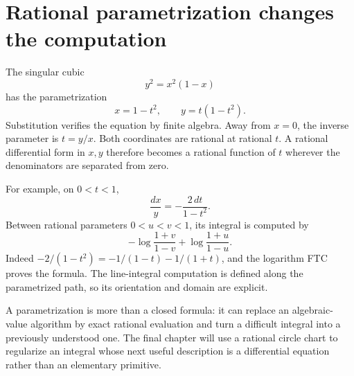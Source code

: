 \section{Rational parametrization changes the computation}
The singular cubic
\[
 y^2=x^2(1-x)
\]
has the parametrization
\[
 x=1-t^2,\qquad y=t(1-t^2).
\]
Substitution verifies the equation by finite algebra.  Away from $x=0$,
the inverse parameter is $t=y/x$.  Both coordinates are rational at
rational $t$.  A rational differential form in $x,y$ therefore becomes a
rational function of $t$ wherever the denominators are separated from
zero.

For example, on $0<t<1$,
\[
 \frac{dx}{y}=-\frac{2\,dt}{1-t^2}.
\]
Between rational parameters $0<u<v<1$, its integral is computed by
\[
 -\log\frac{1+v}{1-v}+\log\frac{1+u}{1-u}.
\]
Indeed $-2/(1-t^2)=-1/(1-t)-1/(1+t)$, and the logarithm FTC proves the
formula.  The line-integral computation is defined along the parametrized
path, so its orientation and domain are explicit.

A parametrization is more than a closed formula: it can replace an
algebraic-value algorithm by exact rational evaluation and turn a difficult
integral into a previously understood one.  The final chapter will use a
rational circle chart to regularize an integral whose next useful description is a differential equation
rather than an elementary primitive.
